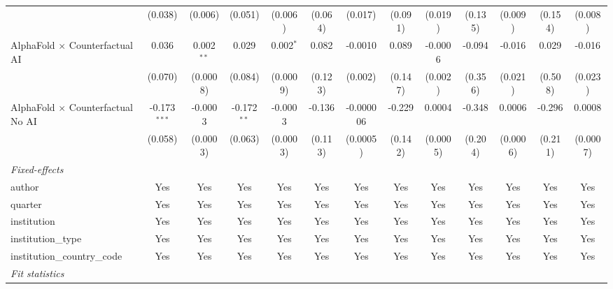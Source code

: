 \begin{tabular}{lcccccccccccc}
                                            & (0.038)        & (0.006)      & (0.051)       & (0.006)     & (0.064)       & (0.017)     & (0.091)      & (0.019)     & (0.135) & (0.009)  & (0.154) & (0.008)\\   
   AlphaFold $\times$ Counterfactual AI     & 0.036          & 0.002$^{**}$ & 0.029         & 0.002$^{*}$ & 0.082         & -0.0010     & 0.089        & -0.0006     & -0.094  & -0.016   & 0.029   & -0.016\\   
                                            & (0.070)        & (0.0008)     & (0.084)       & (0.0009)    & (0.123)       & (0.002)     & (0.147)      & (0.002)     & (0.356) & (0.021)  & (0.508) & (0.023)\\   
   AlphaFold $\times$ Counterfactual No AI  & -0.173$^{***}$ & -0.0003      & -0.172$^{**}$ & -0.0003     & -0.136        & -0.000006   & -0.229       & 0.0004      & -0.348  & 0.0006   & -0.296  & 0.0008\\   
                                            & (0.058)        & (0.0003)     & (0.063)       & (0.0003)    & (0.113)       & (0.0005)    & (0.142)      & (0.0005)    & (0.204) & (0.0006) & (0.211) & (0.0007)\\   
   \midrule
   \emph{Fixed-effects}\\
   author                                   & Yes            & Yes          & Yes           & Yes         & Yes           & Yes         & Yes          & Yes         & Yes     & Yes      & Yes     & Yes\\  
   quarter                                  & Yes            & Yes          & Yes           & Yes         & Yes           & Yes         & Yes          & Yes         & Yes     & Yes      & Yes     & Yes\\  
   institution                              & Yes            & Yes          & Yes           & Yes         & Yes           & Yes         & Yes          & Yes         & Yes     & Yes      & Yes     & Yes\\  
   institution\_type                        & Yes            & Yes          & Yes           & Yes         & Yes           & Yes         & Yes          & Yes         & Yes     & Yes      & Yes     & Yes\\  
   institution\_country\_code               & Yes            & Yes          & Yes           & Yes         & Yes           & Yes         & Yes          & Yes         & Yes     & Yes      & Yes     & Yes\\  
   \midrule
   \emph{Fit statistics}\\

\end{tabular}

